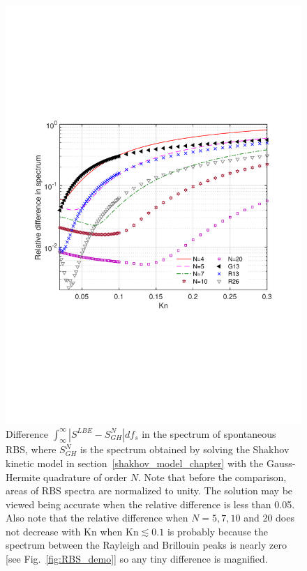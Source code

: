 \begin{figure}[t]
	\centering
	\includegraphics[scale=0.6]{FluidDynamic/IMG/compare_GH.pdf}
	\caption{Difference $\int_{\infty}^{\infty} |S^{LBE}-S_{GH}^{N}| df_s$ in the spectrum of spontaneous RBS, where $S_{GH}^{N}$ is the spectrum obtained by solving the Shakhov kinetic model in section~\ref{shakhov_model_chapter} with the Gauss-Hermite quadrature of order $N$.  Note that before the comparison, areas of RBS spectra are normalized to unity. The solution may be viewed being accurate when the relative difference is less than 0.05. Also note that the relative difference when $N=5, 7, 10$ and 20 does not decrease with $\text{Kn}$ when $\text{Kn}\lesssim0.1$ is probably because the spectrum between the Rayleigh and Brillouin peaks is nearly zero [see Fig.~\ref{fig:RBS_demo}] so any tiny difference is magnified.}
	\label{fig:compare2}
\end{figure}

